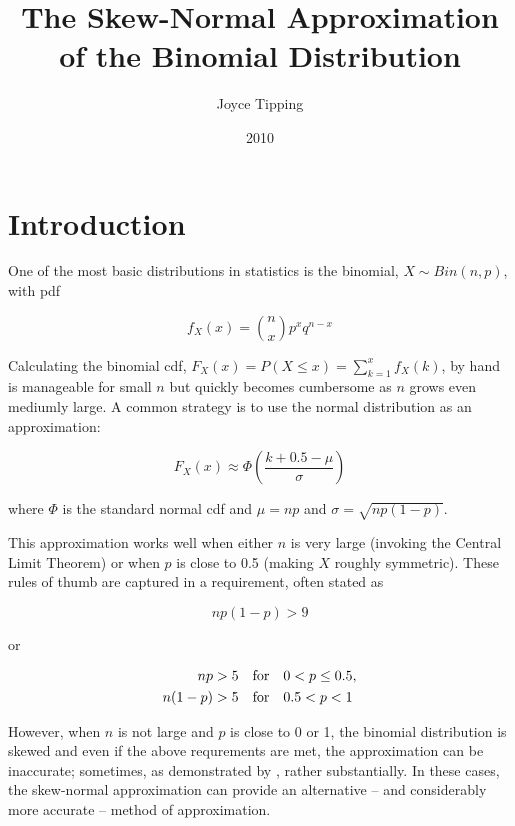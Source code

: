 \title{The Skew-Normal Approximation of the Binomial Distribution}
\author{Joyce Tipping}
\date{2010}
\maketitle

\section{Introduction}

One of the most basic distributions in statistics is the binomial, $X \sim
Bin(n,p)$, with pdf

\begin{equation*}
  f_X(x) = \binom{n}{x} p^x q^{n-x}
\end{equation*}

Calculating the binomial cdf, $F_X(x) = P(X \leq x) = \sum_{k=1}^x f_X(k)$, by
hand is manageable for small $n$ but quickly becomes cumbersome as $n$ grows
even mediumly large. A common strategy is to use the normal distribution as an
approximation:

\begin{equation}
  F_X(x) \approx \Phi \left( \frac{k + 0.5 - \mu}{\sigma} \right)
\end{equation}

where $\Phi$ is the standard normal cdf and $\mu = np$ and $\sigma =
\sqrt{np(1-p)}$.

This approximation works well when either $n$ is very large (invoking the
Central Limit Theorem) or when $p$ is close to 0.5 (making $X$ roughly
symmetric). These rules of thumb are captured in a requirement, often stated as

\begin{equation*}
  np(1-p) > 9
\end{equation*}

or

\begin{align*}
      np &> 5 \quad \textnormal{for} \quad  0 < p \leq 0.5, \\
  n(1-p) &> 5 \quad \textnormal{for} \quad  0.5 < p < 1
\end{align*}

However, when $n$ is not large and $p$ is close to 0 or 1, the binomial
distribution is skewed and even if the above requrements are met, the
approximation can be inaccurate; sometimes, as demonstrated by \citet{mabs},
rather substantially. In these cases, the skew-normal approximation can provide
an alternative -- and considerably more accurate -- method of approximation.
